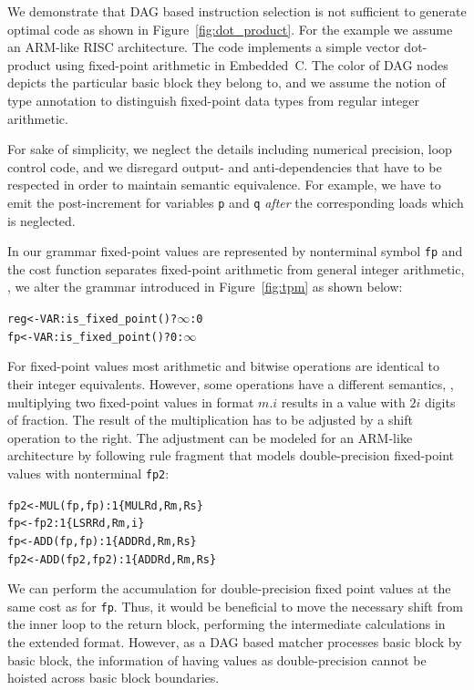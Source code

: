 We demonstrate that DAG based instruction selection is not
sufficient to generate optimal code as shown in
Figure~\ref{fig:dot_product}. For the example we assume an ARM-like RISC
architecture. The code implements a simple vector dot-product using
fixed-point arithmetic in Embedded~C. The color of DAG nodes depicts
the particular basic block they belong to, and we assume the notion of type
annotation to distinguish fixed-point data types from
regular integer arithmetic.

For sake of simplicity, we neglect the details including numerical precision,
loop control code, and we disregard output- and anti-dependencies
that have to be respected in order to maintain semantic equivalence.
For example, we have to emit the
post-increment for variables \texttt{p} and \texttt{q} \emph{after} the
corresponding loads which is neglected.

In our grammar fixed-point values are represented by
nonterminal symbol \texttt{fp} and the cost function
separates fixed-point arithmetic from general integer arithmetic,
\ie, we alter the grammar introduced in Figure~\ref{fig:tpm} as
shown below:
\begin{alltt}
   reg <- VAR : is\_fixed_point() ? \(\infty\) : 0
   fp  <- VAR : is\_fixed_point() ? 0 : \(\infty\)
\end{alltt}
For fixed-point values most arithmetic and bitwise operations are
identical to their integer equivalents. However, some operations have
a different semantics, \eg, multiplying two fixed-point values in
format $m.i$ results in a value with $2i$ digits of fraction. The
result of the multiplication has to be adjusted by a shift operation
to the right. The adjustment can be modeled for an ARM-like
architecture by following rule fragment that models double-precision
fixed-point values with nonterminal \texttt{fp2}:
\begin{alltt}
   fp2 <- MUL(fp, fp)   : 1   \{ MUL Rd, Rm, Rs \}
   fp  <- fp2           : 1   \{ LSR Rd, Rm, i  \}
   fp  <- ADD(fp, fp)   : 1   \{ ADD Rd, Rm, Rs \}
   fp2 <- ADD(fp2, fp2) : 1   \{ ADD Rd, Rm, Rs \}
\end{alltt}
We can perform the accumulation for double-precision fixed
point values at the same cost as for \texttt{fp}. Thus, it would be
beneficial to move the necessary shift from the inner loop to the
return block, performing the intermediate calculations in the extended
format. However, as a DAG based matcher processes basic block by
basic block, the information of having values as double-precision
cannot be hoisted across basic block boundaries.

